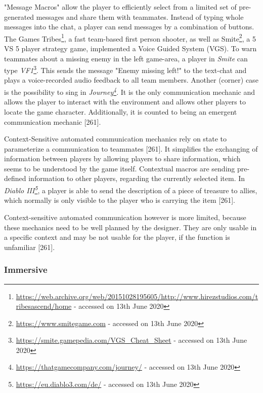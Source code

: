 "Message Macros" allow the player to efficiently select from a limited set of pre-generated messages and share them with teammates. Instead of typing whole messages into the chat, a player can send messages by a combination of buttons.
The Games Tribes\footnote{\url{https://web.archive.org/web/20151028195605/http://www.hirezstudios.com/tribesascend/home} - accessed on 13th June 2020}, a fast team-based first person shooter, as well as Smite\footnote{\url{https://www.smitegame.com} - accessed on 13th June 2020}, a 5 VS 5 player strategy game, implemented a Voice Guided System (VGS). To warn teammates about a missing enemy in the left game-area, a player in \textit{Smite} can type \textit{VF1}\footnote{\url{https://smite.gamepedia.com/VGS_Cheat_Sheet} - accessed on 13th June 2020}. This sends the message "Enemy missing left!" to the text-chat and plays a voice-recorded audio feedback to all team members.
Another (corner) case is the possibility to sing in \textit{Journey\footnote{\url{https://thatgamecompany.com/journey/} - accessed on 13th June 2020}}. It is the only communication mechanic and allows the player to interact with the environment and allows other players to locate the game character. Additionally, it is counted to being an emergent communication mechanic \autocite{Toups2014ATheory}[261].


Context-Sensitive automated communication mechanics rely on state to parameterize a communication to teammates \autocite{Toups2014ATheory}[261]. It simplifies the exchanging of information between players by allowing players to share information, which seems to be understood by the game itself.
Contextual macros are sending pre-defined information to other players, regarding the currently selected item. In \textit{Diablo III\footnote{\url{https://eu.diablo3.com/de/} - accessed on 13th June 2020}}, a player is able to send the description of a piece of treasure to allies, which normally is only visible to the player who is carrying the item \autocite{Toups2014ATheory}[261].

Context-sensitive automated communication however is more limited, because these mechanics need to be well planned by the designer. They are only usable in a specific context and may be not usable for the player, if the function is unfamiliar \autocite{Toups2014ATheory}[261]. 


\subsubsection{Immersive}
\label{section:Immersive}

